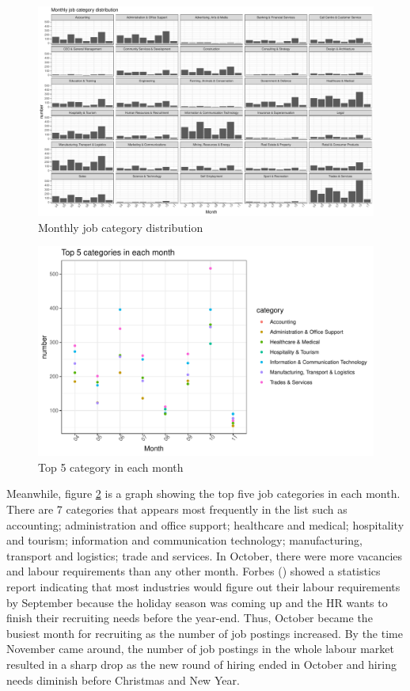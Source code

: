 \documentclass[11pt,a4paper,]{article}
\begin{document}
\begin{figure}
\centering
\includegraphics{Team_JHDP_Assignment4_files/figure-latex/monthly-1.pdf}
\caption{\label{fig:monthly}Monthly job category distribution}
\end{figure}

\begin{figure}
\centering
\includegraphics{Team_JHDP_Assignment4_files/figure-latex/number-1.pdf}
\caption{\label{fig:number}Top 5 category in each month}
\end{figure}

Meanwhile, figure \ref{fig:number} is a graph showing the top five job categories in each month. There are 7 categories that appears most frequently in the list such as accounting; administration and office support; healthcare and medical; hospitality and tourism; information and communication technology; manufacturing, transport and logistics; trade and services. In October, there were more vacancies and labour requirements than any other month. Forbes (\textcite{whitehead}) showed a statistics report indicating that most industries would figure out their labour requirements by September because the holiday season was coming up and the HR wants to finish their recruiting needs before the year-end. Thus, October became the busiest month for recruiting as the number of job postings increased. By the time November came around, the number of job postings in the whole labour market resulted in a sharp drop as the new round of hiring ended in October and hiring needs diminish before Christmas and New Year.
\end{document}
